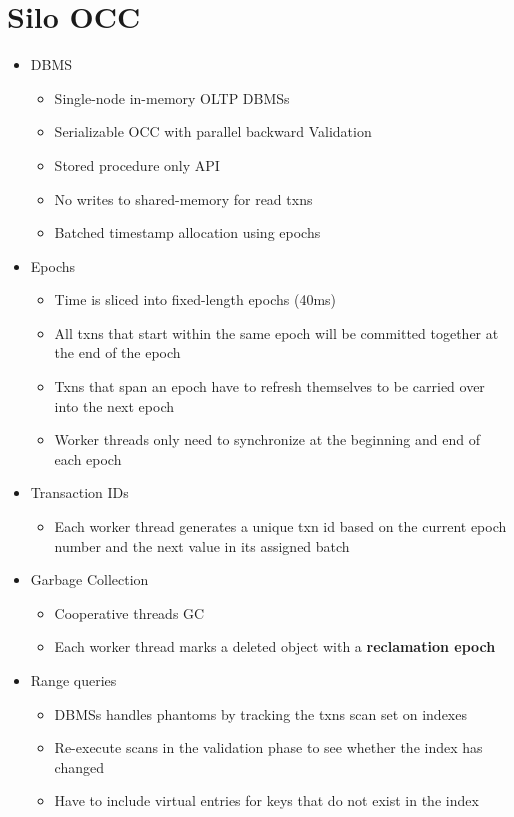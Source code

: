 \documentclass[11pt]{article}
\begin{document}
\section{Silo OCC}
\begin{itemize}
    \item {} DBMS ~\cite{tu-sosp2013}
    \begin{itemize}
        \item Single-node in-memory OLTP DBMSs
        \item Serializable OCC with parallel backward Validation
        \item Stored procedure only API
        \item No writes to shared-memory for read txns
        \item Batched timestamp allocation using epochs
    \end{itemize}
    \item Epochs
    \begin{itemize}
        \item Time is sliced into fixed-length epochs (40ms)
        \item All txns that start within the same epoch will be committed together at the end of the epoch
        \item Txns that span an epoch have to refresh themselves to be carried over into the next epoch
        \item Worker threads only need to synchronize at the beginning and end of each epoch
    \end{itemize}
    \item Transaction IDs
    \begin{itemize}
        \item Each worker thread generates a unique txn id based on the current epoch number and the next value in its assigned batch
    \end{itemize}
    \item Garbage Collection
    \begin{itemize}
        \item Cooperative threads GC
        \item Each worker thread marks a deleted object with a \textbf{reclamation epoch}
    \end{itemize}
    \item Range queries
    \begin{itemize}
        \item DBMSs handles phantoms by tracking the txns scan set on indexes
        \item Re-execute scans in the validation phase to see whether the index has changed
        \item Have to include virtual entries for keys that do not exist in the index
    \end{itemize}
\end{itemize}
\end{document}
